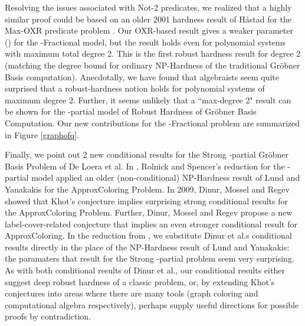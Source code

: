\documentclass{article}
\begin{document}
Resolving the issues associated with Not-2 predicates, we realized that a highly similar proof could be based on an older 2001 hardness result of H{\aa}stad for the Max-OXR predicate problem \citep{hast01}. Our OXR-based result gives a weaker parameter () for the -Fractional model, but the result holds even 
for polynomial systems with maximum total degree 2. This is the first robust hardness result for degree 2 (matching the degree bound for ordinary NP-Hardness of the traditional Gr\"{o}bner Basis computation). Anecdotally, we have found that algebraists seem quite surprised that a robust-hardness notion holds for polynomial systems of maximum degree 2. Further, it seems unlikely that a ``max-degree 2" result can be shown for the -partial model of Robust Hardness of Gr\"{o}bner Basis Computation.
Our new contributions for the -Fractional problem are summarized in Figure \ref{graphofq}.





Finally, we point out 2 new conditional results for the Strong -partial Gr\"{o}bner Basis Problem of De Loera et al.  In \citep{RS}, Rolnick and Spencer's reduction for the -partial model applied an older (non-conditional) NP-Hardness result of Lund and Yanakakis \citep{Lundyan} for the ApproxColoring Problem.
In 2009, Dinur, Mossel and Regev \citep{dinur} showed that Khot's  conjecture implies surprising strong conditional results for the ApproxColoring Problem. Further, Dinur, Mossel and Regev propose a new label-cover-related conjecture that implies an even stronger conditional result for ApproxColoring. In the reduction from \citep{RS}, we substitute Dinur et al.s conditional results directly in the place of the NP-Hardness result of Lund and Yanakakis: the paramaters that result for the Strong -partial problem seem very surprising. As with both conditional results of Dinur et al., our conditional results either suggest deep robust hardness of a classic problem, or, by extending Khot's conjectures into areas where there are many tools (graph coloring and computational algebra respectively), perhaps supply useful directions for possible proofs by contradiction.
\end{document}

